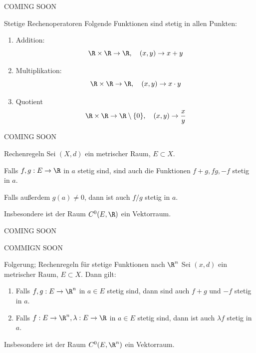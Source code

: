 \begin{beweisbox}
    COMING SOON
\end{beweisbox}

\begin{lemma}{Stetige Rechenoperatoren}
    Folgende Funktionen sind stetig in allen Punkten:
    \begin{enumerate}
        \item Addition:
        $$
            \R \times \R \to \R, \quad (x,y) \to x + y
        $$
        
        \item Multiplikation:
        $$
            \R \times \R \to \R, \quad (x,y) \to x \cdot y
        $$

        \item Quotient
        $$
            \R \times \R \to \R \setminus \{0\}, \quad (x,y) \to \dfrac{x}{y}
        $$
    \end{enumerate}
\end{lemma}

\begin{beweisbox}
    COMING SOON
\end{beweisbox}

\begin{lemma}{Rechenregeln}
    Sei $(X,d)$ ein metrischer Raum, $E \subset X$.
    \vspace{1em}

    Falls $f,g : E \to \R$ in $a$ stetig sind, sind auch die Funktionen $f+g, fg, -f$ stetig in $a$.
    \vspace{1em}

    Falls außerdem $g(a) \not= 0$, dann ist auch $f/g$ stetig in $a$.
    \vspace{1em}

    Insbesondere ist der Raum $C^0(E,\R)$ ein Vektorraum.
\end{lemma}

\begin{bemerkungbox}
    COMING SOON
\end{bemerkungbox}

\begin{beweisbox}
    COMMIGN SOON
\end{beweisbox}

\begin{lemma}{Folgerung; Rechenregeln für stetige Funktionen nach $\R^n$}
    Sei $(x,d)$ ein metrischer Raum, $E \subset X$. Dann gilt:
    \begin{enumerate}
        \item Falls $f,g:E \to \R^n$ in $a \in E$ stetig sind, dann sind auch $f+g$ und $-f$ stetig in $a$.
        \item Falls $f:E \to \R^n, \lambda:E \to \R$ in $a\in E$ stetig sind, dann ist auch $\lambda f$ stetig in $a$.
    \end{enumerate}

    Insbesondere ist der Raum $C^0(E,\R^n)$ ein Vektorraum.
\end{lemma}

